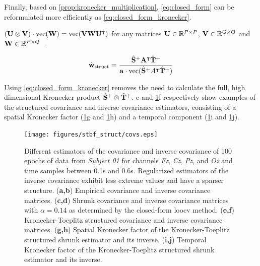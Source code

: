 	Finally, based on \cref{prop:kronecker_multiplication},
	\cref{eq:closed_form} can be reformulated more efficiently as
	\cref{eq:closed_form_kronecker}.
	\begin{property}
    $(\mathbf{U}\otimes \mathbf{V})\cdot\text{vec}(\mathbf{W}) =
    \text{vec}(\mathbf{V}\mathbf{W}\mathbf{U}^\intercal)$
    for any matrices $\mathbf{U}\in\mathbb{R}^{P\times P}$,
    $\mathbf{V}\in\mathbb{R}^{Q\times Q}$ and $\mathbf{W}\in\mathbb{R}^{P\times Q}$~\cite{Loan2000}.
		\label{prop:kronecker_multiplication}
	\end{property}

	\begin{equation}
		\hat{\mathbf{w}}_\text{struct} =
    \frac{\hat{\mathbf{S}}^+\mathbf{A}^\intercal\hat{\mathbf{T}}^+}
    {\mathbf{a}\cdot\text{vec}(\hat{\mathbf{S}}^+A^\intercal\hat{\mathbf{T}}^+)}
		\label{eq:closed_form_kronecker}
	\end{equation}

	Using \cref{eq:closed_form_kronecker} removes the need to calculate the
  full, high dimensional Kronecker product $\hat{\mathbf{S}}^+\otimes
    \hat{\mathbf{T}}^+$.
	e and \cref{fig:kronlda-covs}f respectively show examples of the
	structured covariance and inverse covariance estimators,
	consisting of a spatial Kronecker factor (\cref{fig:kronlda-covs}g and
	\cref{fig:kronlda-covs}h) and a temporal component (\cref{fig:kronlda-covs}i and
	\cref{fig:kronlda-covs}j).

	\begin{figure}
		\texttt{[image: figures/stbf\_struct/covs.eps]}
    \caption[Estimated covariance and inverse covariance.]{Different estimators of the covariance and inverse covariance
			of 100 epochs of data from \textit{Subject 01} for channels
			\textit{Fz}, \textit{Cz}, \textit{Pz}, and \textit{Oz} and time samples between 0.1s and 0.6s.
			Regularized estimators of the inverse covariance exhibit less extreme values and have a sparser structure.
			(\textbf{a,b}) Empirical covariance and inverse covariance matrices.
			(\textbf{c,d}) Shrunk covariance and inverse covariance matrices with $\alpha=0.14$ as
			determined by the closed-form \ac{loocv} method. (\textbf{e,f}) Kronecker-Toeplitz
			structured covariance and inverse covariance matrices.
			(\textbf{g,h}) Spatial Kronecker factor of the Kronecker-Toeplitz structured shrunk estimator and its inverse.
			(\textbf{i,j}) Temporal Kronecker factor of the Kronecker-Toeplitz structured shrunk estimator and its inverse.}
		\label{fig:kronlda-covs}
	\end{figure}

